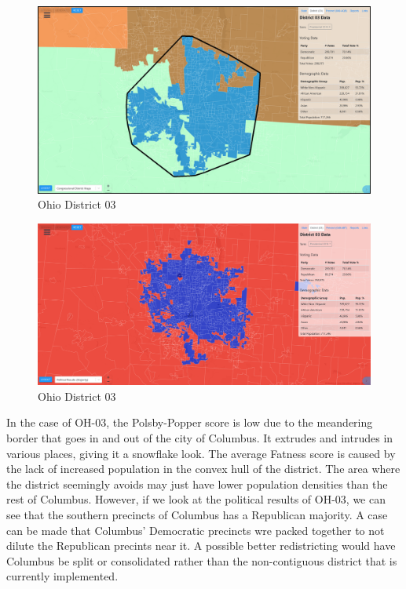 \documentclass[letterpaper]{article}
\begin{document}
\begin{figure}[H]
	\includegraphics[width=\linewidth]{./figures/OH-03-ConvexHull.png}
	\caption{Ohio District 03}
	\label{fig:oh03ch}
\end{figure}

\begin{figure}[H]
	\includegraphics[width=\linewidth]{./figures/OH-03-PoliticalResults.png}
	\caption{Ohio District 03}
	\label{fig:oh03pr}
\end{figure}

In the case of OH-03, the Polsby-Popper score is low due to the meandering border that goes in and out of the city of Columbus. It extrudes and intrudes in various places, giving it a snowflake look. The average Fatness score is caused by the lack of increased population in the convex hull of the district. The area where the district seemingly avoids may just have lower population densities than the rest of Columbus. However, if we look at the political results of OH-03, we can see that the southern precincts of Columbus has a Republican majority. A case can be made that Columbus' Democratic precincts wre packed together to not dilute the Republican precints near it. A possible better redistricting would have Columbus be split or consolidated rather than the non-contiguous district that is currently implemented.
\end{document}
